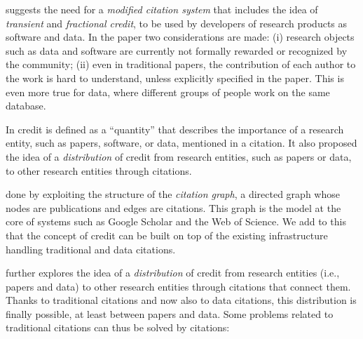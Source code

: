 \citet{transitiveCreditKatz2014} suggests the need for a \emph{modified citation system} that includes the idea of \emph{transient} and \emph{fractional credit}, to be used by developers of research products as software and data.
In the paper two considerations are made: (i) research objects such as data and software are currently not formally rewarded or recognized by the community; 
(ii) even in traditional papers, the contribution of each author to the work is hard to understand, unless explicitly specified in the paper. 
This is even more true for data, where different groups of people work on the same database.

In \citep{transitiveCreditKatz2014} credit is defined as a ``quantity'' that describes the importance of a research entity, such as papers, software, or data, mentioned in a citation. 
It also proposed the idea of a \emph{distribution} of credit from research entities, such as papers or data, to other research entities through citations. 

 done by exploiting the structure of the \emph{citation graph}, a directed graph whose nodes are publications and edges are citations.
This graph is the model at the core of systems such as Google Scholar and the Web of Science.
We add to this that the concept of credit can be built on top of the existing infrastructure handling traditional and data citations.

\citet{transitiveCreditKatz2014} further explores the idea of a \emph{distribution} of credit from research entities (i.e., papers and data) to other research entities through citations that connect them. 
Thanks to traditional citations and now also to data citations, this distribution is finally possible, at least between papers and data. 
Some problems related to traditional citations can thus be solved by citations:

